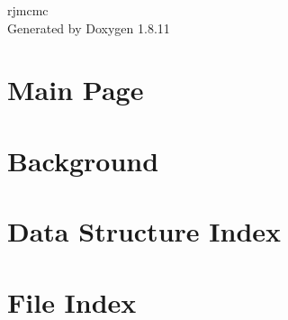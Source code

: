 \documentclass[twoside]{book}
\newcommand{\+}{\discretionary{\mbox{\scriptsize$\hookleftarrow$}}{}{}}
\newcommand{\clearemptydoublepage}{%
  \newpage{\pagestyle{empty}\cleardoublepage}%
}
\begin{document}
\hypersetup{pageanchor=false,
             bookmarksnumbered=true,
             pdfencoding=unicode
            }
\begin{titlepage}
\vspace*{7cm}
\begin{center}%
{\Large rjmcmc }\\
\vspace*{1cm}
{\large Generated by Doxygen 1.8.11}\\
\end{center}
\end{titlepage}
\clearemptydoublepage
\tableofcontents
\clearemptydoublepage
{}
\hypersetup{pageanchor=true}

\chapter{Main Page}
\label{index}\hypertarget{index}{}
\chapter{Background}
\label{background}
\hypertarget{background}{}

\chapter{Data Structure Index}

\chapter{File Index}

\end{document}
